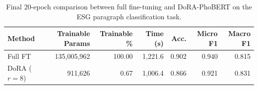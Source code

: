 \begin{table}[t]
\centering
\caption{Final 20-epoch comparison between full fine-tuning and DoRA-PhoBERT on the ESG paragraph classification task.}
\label{tab:training_efficiency_summary}
\small
\begin{tabular}{lrrrrrr}
\toprule
\textbf{Method} & \textbf{Trainable Params} & \textbf{Trainable \%} & \textbf{Time (s)} & \textbf{Acc.} & \textbf{Micro F1} & \textbf{Macro F1} \\
\midrule
Full FT & 135,005,962 & 100.00 & 1,221.6 & 0.902 & 0.940 & 0.815 \\
DoRA ($r=8$) & 911,626 & 0.67 & 1,006.4 & 0.866 & 0.921 & 0.831 \\
\bottomrule
\end{tabular}
\end{table}
